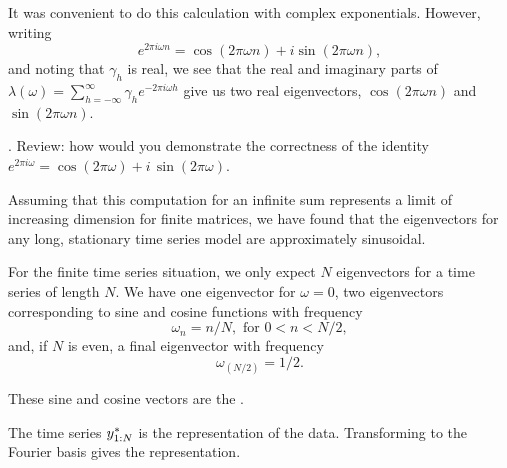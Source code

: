 \begin{frame}

\bi
\item  It was convenient to do this calculation with complex exponentials. However, writing
\begin{equation} e^{2\pi i\omega n} = \cos(2\pi\omega n) + i \sin(2\pi\omega n),\end{equation}
and noting that $\gamma_h$ is real, we see that the real and imaginary parts of $\lambda(\omega)= \sum_{h=-\infty}^\infty \gamma_{h}  e^{-2\pi i\omega h}$ give us two real eigenvectors, $\cos(2\pi\omega n)$ and $\sin(2\pi\omega n)$.
\ei

\vspace{2mm}

\myquestion. Review: how would you demonstrate the correctness of the identity
$e^{2\pi i\omega} = \cos(2\pi\omega)+i\,\sin(2\pi\omega)$.


\end{frame}

\begin{frame}[fragile]

\bi

\item  Assuming that this computation for an infinite sum represents a limit of increasing dimension for finite matrices, we have found that the eigenvectors for any long, stationary time series model are approximately sinusoidal.

\item  For the finite time series situation, we only expect $N$ eigenvectors for a time series of length $N$. We have one eigenvector for $\omega=0$, two eigenvectors corresponding to sine and cosine functions with frequency
\begin{equation}\omega_{n} = n/N, \mbox{ for $0<n<N/2$},\end{equation}
and, if $N$ is even,  a final eigenvector with frequency
\begin{equation}
\omega_{(N/2)} = 1/2.
\end{equation}

\item  These sine and cosine vectors are the .

\item The time series  $y^*_{1:N}$ is the  representation of the data. Transforming to the Fourier basis gives the  representation.

\ei

\end{frame}

